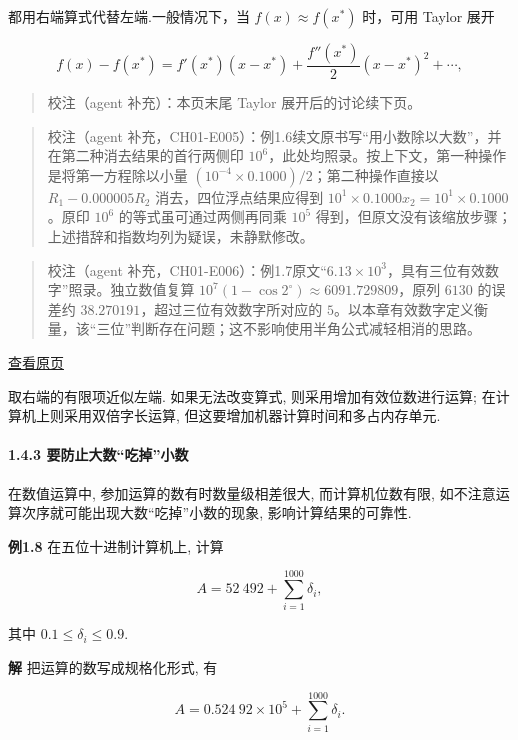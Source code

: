 \documentclass[
  10pt,
  fontset=fandol]{ctexart}
\begin{document}
都用右端算式代替左端.一般情况下，当 \(f(x)\approx f(x^*)\) 时，可用 Taylor 展开

\[
f(x)-f(x^*)=f'(x^*) (x-x^*)+\frac{f''(x^*)}{2} (x-x^*)^2+\cdots,
\]

\begin{quote}
校注（agent 补充）：本页末尾 Taylor 展开后的讨论续下页。
\end{quote}

\begin{quote}
校注（agent 补充，CH01-E005）：例1.6续文原书写``用小数除以大数''，并在第二种消去结果的首行两侧印 \(10^6\)，此处均照录。按上下文，第一种操作是将第一方程除以小量 \((10^{-4}\times0.1000)/2\)；第二种操作直接以 \(R_1-0.000005R_2\) 消去，四位浮点结果应得到 \(10^1\times0.1000x_2=10^1\times0.1000\)。原印 \(10^6\) 的等式虽可通过两侧再同乘 \(10^5\) 得到，但原文没有该缩放步骤；上述措辞和指数均列为疑误，未静默修改。
\end{quote}

\begin{quote}
校注（agent 补充，CH01-E006）：例1.7原文``\(6.13\times10^3\)，具有三位有效数字''照录。独立数值复算 \(10^7(1-\cos2^\circ)\approx6091.729809\)，原列 \(6130\) 的误差约 \(38.270191\)，超过三位有效数字所对应的 \(5\)。以本章有效数字定义衡量，该``三位''判断存在问题；这不影响使用半角公式减轻相消的思路。
\end{quote}

\href{../../source-images/pdf-024.jpeg}{查看原页}

取右端的有限项近似左端. 如果无法改变算式, 则采用增加有效位数进行运算; 在计算机上则采用双倍字长运算, 但这要增加机器计算时间和多占内存单元.

\paragraph{1.4.3 要防止大数``吃掉''小数}\label{ux8981ux9632ux6b62ux5927ux6570ux5403ux6389ux5c0fux6570}

在数值运算中, 参加运算的数有时数量级相差很大, 而计算机位数有限, 如不注意运算次序就可能出现大数``吃掉''小数的现象, 影响计算结果的可靠性.

\textbf{例1.8} 在五位十进制计算机上, 计算

\[
A = 52\ 492 + \sum_{i=1}^{1000} \delta_i,
\]

其中 \(0.1 \leqslant \delta_i \leqslant 0.9\).

\textbf{解} 把运算的数写成规格化形式, 有

\[
A = 0.524\ 92 \times 10^5 + \sum_{i=1}^{1000} \delta_i.
\]
\end{document}
